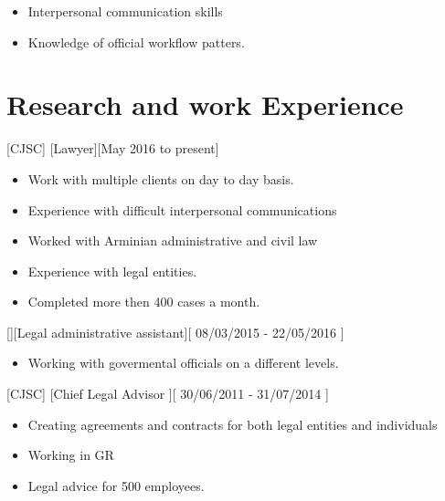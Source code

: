 \documentclass{article}
\begin{document}

\begin{itemize}
\item Interpersonal communication skills
\item Knowledge of official workflow patters.
\end{itemize}

\section{Research and work Experience}
 

 
[CJSC]
[Lawyer][May 2016 to present]
   \begin{itemize}
   \item Work  with multiple clients on day to day basis.
   \item Experience with difficult interpersonal communications
   \item Worked with Arminian administrative and civil law
   \item Experience with legal entities.
   \item Completed more then 400 cases a month.
   \end{itemize}

[][Legal administrative assistant][ 08/03/2015 - 22/05/2016 ]
\begin{itemize}
   \item Working with govermental officials on a different levels.
   \end{itemize}

[CJSC]
[Chief Legal Advisor ][ 30/06/2011 - 31/07/2014 ]
\begin{itemize}
   \item Creating agreements and contracts for both legal entities and individuals
   \item Working in GR
   \item Legal advice for 500 employees. 
\end{itemize}
 
\end{document}

